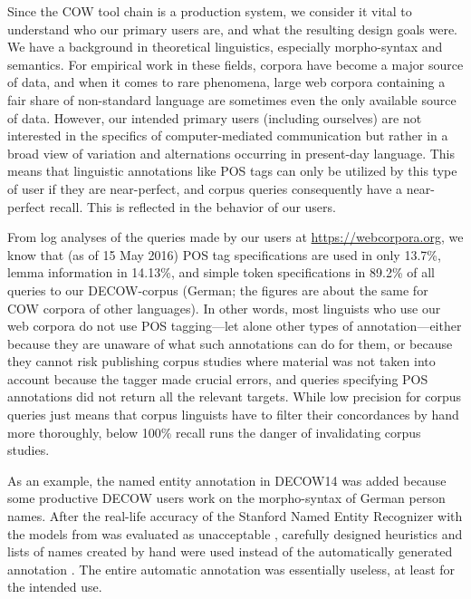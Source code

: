 \documentclass[11pt]{article}
\begin{document}
Since the COW tool chain is a production system, we consider it vital to understand who our primary users are, and what the resulting design goals were.
We have a background in theoretical linguistics, especially morpho-syntax and semantics.
For empirical work in these fields, corpora have become a major source of data, and when it comes to rare phenomena, large web corpora containing a fair share of non-standard language are sometimes even the only available source of data.
However, our intended primary users (including ourselves) are not interested in the specifics of computer-mediated communication but rather in a broad view of variation and alternations occurring in present-day language.
This means that linguistic annotations like POS tags can only be utilized by this type of user if they are near-perfect, and corpus queries consequently have a near-perfect recall.
This is reflected in the behavior of our users.

From log analyses of the queries made by our users at \url{https://webcorpora.org}, we know that (as of 15 May 2016) POS tag specifications are used in only 13.7\%, lemma information in 14.13\%, and simple token specifications in 89.2\% of all queries to our DECOW-corpus (German; the figures are about the same for COW corpora of other languages).
In other words, most linguists who use our web corpora do not use POS tagging---let alone other types of annotation---either because they are unaware of what such annotations can do for them, or because they cannot risk publishing corpus studies where material was not taken into account because the tagger made crucial errors, and queries specifying POS annotations did not return all the relevant targets.
While low precision for corpus queries just means that corpus linguists have to filter their concordances by hand more thoroughly, below 100\% recall runs the danger of invalidating corpus studies.

As an example, the named entity annotation in DECOW14 was added because some productive DECOW users work on the morpho-syntax of German person names.
After the real-life accuracy of the Stanford Named Entity Recognizer with the models from  was evaluated as unacceptable \cite{Helmers2013}, carefully designed heuristics and lists of names created by hand were used instead of the automatically generated annotation \cite{Ackermann2016}.
The entire automatic annotation was essentially useless, at least for the intended use.
\end{document}
